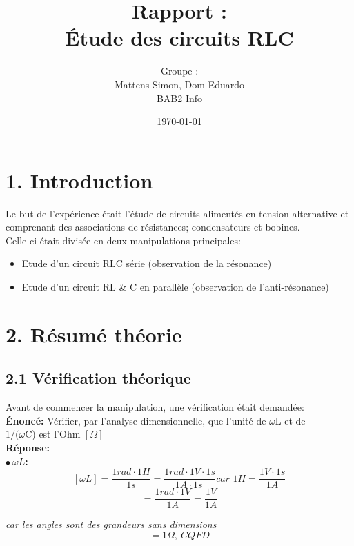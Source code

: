 \documentclass{report}
\title{Rapport : \\ \'Etude des circuits RLC}
\author{Groupe : \\ Mattens Simon, Dom Eduardo \\ BAB2 Info}
\date{\today}
\begin{document}
\maketitle

\section*{1. Introduction}

\hspace*{0,5cm} Le but de l'exp\'erience \'etait l'\'etude de circuits aliment\'es en tension alternative et comprenant des associations de r\'esistances; condensateurs et bobines.\\
Celle-ci \'etait divis\'ee en deux manipulations principales:
\begin{itemize}
\item Etude d'un circuit RLC s\'erie (observation de la r\'esonance)
\item Etude d'un circuit RL \& C en parall\`ele (observation de l'anti-r\'esonance)
\end{itemize}

\section*{2. R\'esum\'e th\'eorie}
\subsection*{2.1 V\'erification th\'eorique}
Avant de commencer la manipulation, une v\'erification \'etait demand\'ee: \\

\textbf{\'Enonc\'e:} V\'erifier, par l'analyse dimensionnelle, que l'unit\'e de $\omega$L et de \\ 
\hspace*{2,07cm}$1/(\omega$C) est l'Ohm $[\Omega]$ \\ 

\textbf{R\'eponse:} \\

\textbf{$\bullet\ \omega L$:} \\
$$[\omega L] = \frac{1rad\cdot 1H}{1s} = \frac{1rad\cdot 1V\cdot 1s}{1A\cdot 1s\ }\textit{car\ } 1H = \frac{1V\cdot 1s}{1A}$$ 
$$= \frac{1rad\cdot 1V}{1A} = \frac{1V}{1A}$$ \begin{center}
\textit{car les angles sont des grandeurs sans dimensions} 
$$ = 1\Omega,\ CQFD $$
\end{center}
\end{document}
